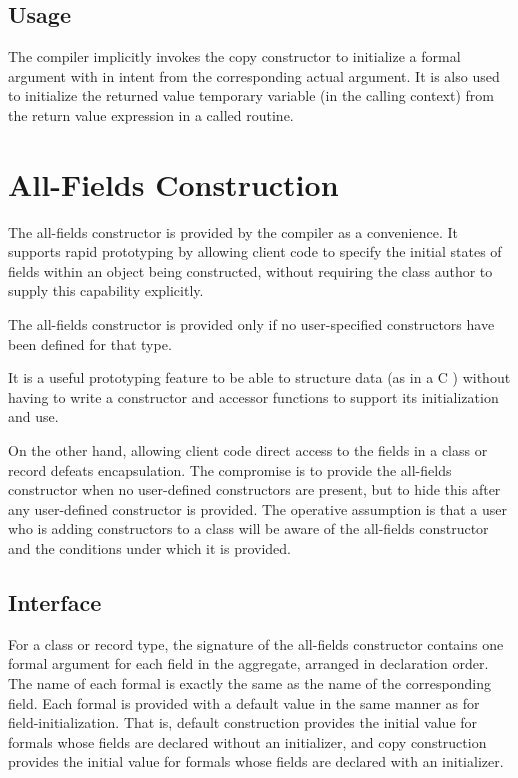 \subsection{Usage}

The compiler implicitly invokes the copy constructor to initialize a formal
argument with in intent from the corresponding actual argument.  It is also used
to initialize the returned value temporary variable (in the calling context)
from the return value expression in a called routine.

\section{All-Fields Construction}

The all-fields constructor is provided by the compiler as a convenience.  It
supports rapid prototyping by allowing client code to specify the initial states
of fields within an object being constructed, without requiring the class author
to supply this capability explicitly.

The all-fields constructor is provided only if no user-specified constructors
have been defined for that type.  

\begin{rationale}

It is a useful prototyping feature to be able to structure data (as in a C
) without having to write a constructor and accessor functions to
support its initialization and use.

On the other hand, allowing client code direct access to the fields in a class
or record defeats encapsulation.  The compromise is to provide the all-fields
constructor when no user-defined constructors are present, but to hide this
after any user-defined constructor is provided.  The operative assumption is
that a user who is adding constructors to a class will be aware of the
all-fields constructor and the conditions under which it is provided.

\end{rationale}

\subsection{Interface}

For a class or record type, the signature of the all-fields constructor contains
one formal argument for each field in the aggregate, arranged in declaration
order.  The name of each formal is exactly the same as the name of the
corresponding field.  Each formal is provided with a default value in the same
manner as for field-initialization.  That is, default construction provides the
initial value for formals whose fields are declared without an initializer, and
copy construction provides the initial value for formals whose fields are
declared with an initializer. 

